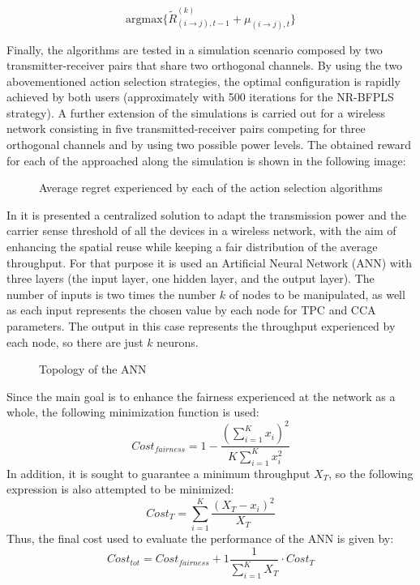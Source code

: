\documentclass[12pt, a4paper,twoside]{tesi_upf}
\begin{document}
				$$\text{argmax}\bigg\{ \tilde{R}_{(i \rightarrow j),t-1}^{(k)} + \mu_{(i \rightarrow j),t}\bigg\}$$
				
				Finally, the algorithms are tested in a simulation scenario composed by two transmitter-receiver pairs that share two orthogonal channels. By using the two abovementioned action selection strategies, the optimal configuration is rapidly achieved by both users (approximately with 500 iterations for the NR-BFPLS strategy). A further extension of the simulations is carried out for a wireless network consisting in five transmitted-receiver pairs competing for three orthogonal channels and by using two possible power levels. The obtained reward for each of the approached along the simulation is shown in the following image:	
				\begin{figure}[h!]
					\centering
					\caption{Average regret experienced by each of the action selection algorithms}
					\label{fig:bandits_results_d2d}
				\end{figure}
			

				In \cite{jamil2016novel} it is presented a centralized solution to adapt the transmission power and the carrier sense threshold of all the devices in a wireless network, with the aim of enhancing the spatial reuse while keeping a fair distribution of the average throughput. For that purpose it is used an Artificial Neural Network (ANN) with three layers (the input layer, one hidden layer, and the output layer). The number of inputs is two times the number $k$ of nodes to be manipulated, as well as each input represents the chosen value by each node for TPC and CCA parameters. The output in this case represents the throughput experienced by each node, so there are just $k$ neurons. 	
				\begin{figure}[h!]
					\centering
					\caption{Topology of the ANN}
					\label{fig:neural_network_topology}
				\end{figure}	
				Since the main goal is to enhance the fairness experienced at the network as a whole, the following minimization function is used:
				\begin{equation}
					Cost_{fairness} = 1 - \frac{(\sum_{i=1}^{K}x_i)^2}{K\sum_{i=1}^{K}x_i^2}
				\end{equation}		
				In addition, it is sought to guarantee a minimum throughput $X_T$, so the following expression is also attempted to be minimized:
				\begin{equation}
					Cost_T = \sum_{i=1}^{K} \frac{(X_T - x_i)^2}{X_T}
				\end{equation}	
				Thus, the final cost used to evaluate the performance of the ANN is given by:
				\begin{equation}
					Cost_{tot} = Cost_{fairness}  + 1 \frac{1}{\sum_{i=1}^{K}X_T} \cdot Cost_T 
				\end{equation}	
				
\end{document}
